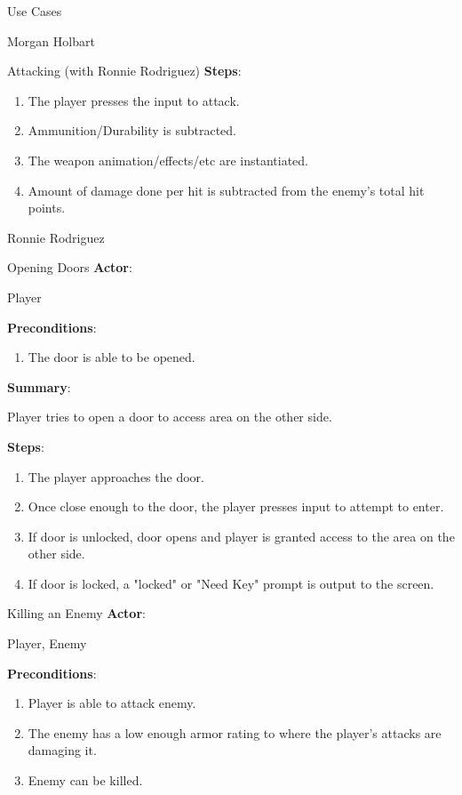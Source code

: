 \documentclass[12pt]{report}
\begin{document}
\begin{section}{Use Cases}
\begin{subsection}{Morgan Holbart}
\begin{subsubsection}{Attacking (with Ronnie Rodriguez)}
\textbf{Steps}:

\begin{enumerate}
\item The player presses the input to attack.
\item Ammunition/Durability is subtracted.
\item The weapon animation/effects/etc are instantiated.
\item Amount of damage done per hit is subtracted from the enemy's total hit
points.
\end{enumerate}
\end{subsubsection}
\end{subsection}

\begin{subsection}{Ronnie Rodriguez}
\begin{subsubsection}{Opening Doors}
\textbf{Actor}:

Player

\textbf{Preconditions}:

\begin{enumerate}
\item The door is able to be opened.
\end{enumerate}

\textbf{Summary}:

Player tries to open a door to access area on the other side. 

\textbf{Steps}:

\begin{enumerate}
\item The player approaches the door.
\item Once close enough to the door, the player presses input to attempt to
enter.
\item If door is unlocked, door opens and player is granted access to the
area on the other side.
\item If door is locked, a "locked" or "Need Key" prompt is output to the
screen.
\end{enumerate}
\end{subsubsection}

\begin{subsubsection}{Killing an Enemy}
\textbf{Actor}:

Player, Enemy

\textbf{Preconditions}:

\begin{enumerate}
\item Player is able to attack enemy.
\item The enemy has a low enough armor rating to where the player's attacks
are damaging it.
\item Enemy can be killed.
\end{enumerate}


\end{subsubsection}
\end{subsection}
\end{section}
\end{document}
